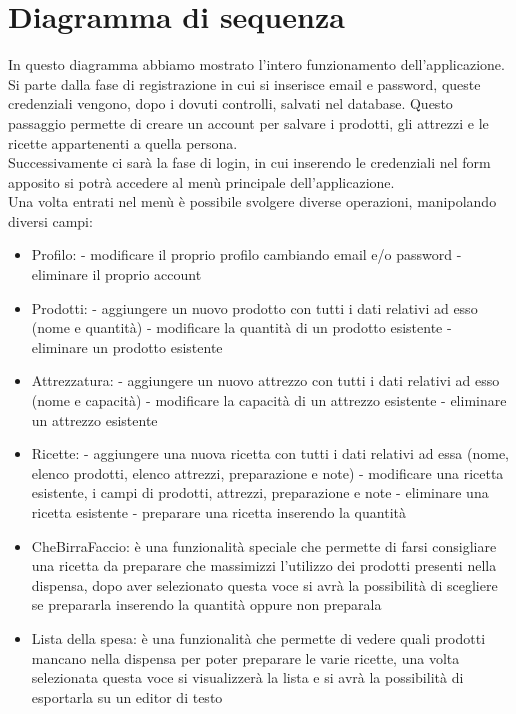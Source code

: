 \documentclass[a4paper, titlepage]{article}
\begin{document}
\newpage
\section{Diagramma di sequenza}
In questo diagramma abbiamo mostrato l'intero funzionamento dell'applicazione.\\
Si parte dalla fase di registrazione in cui si inserisce email e password, queste credenziali vengono, dopo i dovuti controlli, salvati nel database. Questo passaggio permette di creare un account per salvare i prodotti, gli attrezzi e le ricette appartenenti a quella persona.\\
Successivamente ci sarà la fase di login, in cui inserendo le credenziali nel form apposito si potrà accedere al menù principale dell'applicazione.\\
Una volta entrati nel menù è possibile svolgere diverse operazioni, manipolando diversi campi:
\begin{itemize}
    \item Profilo:
        \subitem - modificare il proprio profilo cambiando email e/o password
        \subitem - eliminare il proprio account
    \item Prodotti:
        \subitem - aggiungere un nuovo prodotto con tutti i dati relativi ad esso (nome e quantità)
        \subitem - modificare la quantità di un prodotto esistente
        \subitem - eliminare un prodotto esistente
    \item Attrezzatura:
        \subitem - aggiungere un nuovo attrezzo con tutti i dati relativi ad esso (nome e capacità)
        \subitem - modificare la capacità di un attrezzo esistente
        \subitem - eliminare un attrezzo esistente
    \item Ricette:
        \subitem - aggiungere una nuova ricetta con tutti i dati relativi ad essa (nome, elenco prodotti, elenco attrezzi, preparazione e note)
        \subitem - modificare una ricetta esistente, i campi di prodotti, attrezzi, preparazione e note
        \subitem - eliminare una ricetta esistente
        \subitem - preparare una ricetta inserendo la quantità
    \item CheBirraFaccio:
        \subitem è una funzionalità speciale che permette di farsi consigliare una ricetta da preparare che massimizzi l'utilizzo dei prodotti presenti nella dispensa, dopo aver selezionato questa voce si avrà la possibilità di scegliere se prepararla inserendo la quantità oppure non preparala
    \item Lista della spesa:
        \subitem è una funzionalità che permette di vedere quali prodotti mancano nella dispensa per poter preparare le varie ricette, una volta selezionata questa voce si visualizzerà la lista e si avrà la possibilità di esportarla su un editor di testo 
\end{itemize}
\end{document}
